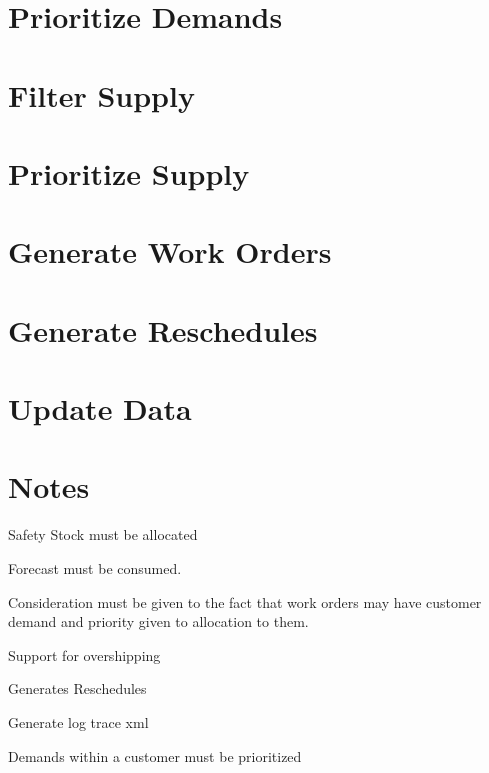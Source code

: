 \documentclass[letterpaper,10pt,english]{sphinxmanual}
\begin{document}
\section{Prioritize Demands}
\label{APS/ComponentsAndServices:prioritize-demands}

\section{Filter Supply}
\label{APS/ComponentsAndServices:filter-supply}

\section{Prioritize Supply}
\label{APS/ComponentsAndServices:prioritize-supply}

\section{Generate Work Orders}
\label{APS/ComponentsAndServices:generate-work-orders}

\section{Generate Reschedules}
\label{APS/ComponentsAndServices:generate-reschedules}

\section{Update Data}
\label{APS/ComponentsAndServices:update-data}

\section{Notes}
\label{APS/ComponentsAndServices:notes}
Safety Stock must be allocated

Forecast must be consumed.

Consideration must be given to the fact that work orders may have
customer demand and priority given to allocation to them.

Support for overshipping

Generates Reschedules

Generate log trace xml

Demands within a customer must be prioritized
\end{document}
